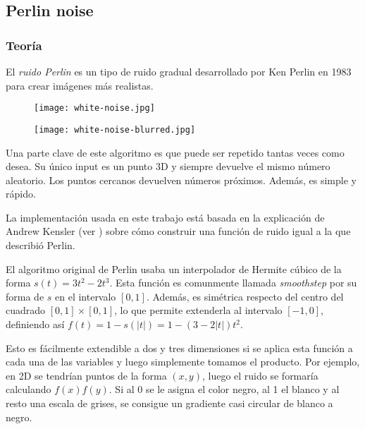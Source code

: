 \subsection{Perlin noise}

\subsubsection{Teoría}

El \textit{ruido Perlin} es un tipo de ruido gradual desarrollado por Ken Perlin en 1983 para crear imágenes más realistas.

\begin{figure}[H]
\centering
\begin{minipage}{.5\textwidth}
  \centering
  \texttt{[image: white-noise.jpg]}
  \label{fig:test1}
\end{minipage}%
\begin{minipage}{.5\textwidth}
  \centering
  \texttt{[image: white-noise-blurred.jpg]}
  \label{fig:test2}
\end{minipage}
\end{figure}

Una parte clave de este algoritmo es que puede ser repetido tantas veces como desea. Su único input es un punto 3D y siempre devuelve el mismo número aleatorio. Los puntos cercanos devuelven números próximos. Además, es simple y rápido.

La implementación usada en este trabajo está basada en la explicación de Andrew Kensler (ver \cite{perlinnoiseimplementation}) sobre cómo construir una función de ruido igual a la que describió Perlin.

El algoritmo original de Perlin usaba un interpolador de Hermite cúbico de la forma $s(t)=3t^2-2t^3$. Esta función es comunmente llamada \textit{smoothstep} por su forma de $s$ en el intervalo $[0,1]$. Además, es simétrica respecto del centro del cuadrado $[0,1]\times[0,1]$, lo que permite extenderla al intervalo $[-1,0]$, definiendo así $f(t)=1-s(|t|)=1-(3-2|t|)t^2$.


Esto es fácilmente extendible a dos y tres dimensiones si se aplica esta función a cada una de las variables y luego simplemente tomamos el producto. Por ejemplo, en 2D se tendrían puntos de la forma $(x,y)$, luego el ruido se formaría calculando $f(x)f(y)$. Si al 0 se le asigna el color negro, al 1 el blanco y al resto una escala de grises, se consigue un gradiente casi circular de blanco a negro.

